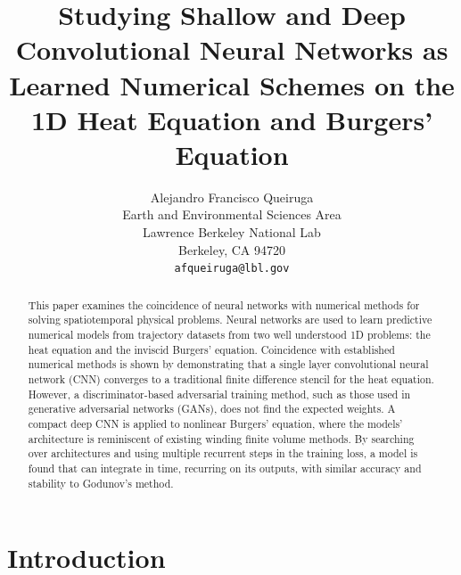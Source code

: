 \documentclass{article}
\title{Studying Shallow and Deep Convolutional Neural Networks as Learned Numerical
  Schemes on the 1D
  Heat Equation and Burgers' Equation}
\author{%
  Alejandro Francisco Queiruga\\%
  Earth and Environmental Sciences Area\\
  Lawrence Berkeley National Lab\\
  Berkeley, CA 94720\\
  \texttt{afqueiruga@lbl.gov}
}
\begin{document}
\maketitle

\begin{abstract}
  This paper examines the coincidence of neural networks with
  numerical methods for solving spatiotemporal physical
  problems. Neural networks are used to learn predictive numerical
  models from trajectory datasets from two well understood 1D
  problems: the heat equation and the inviscid
  Burgers' equation. Coincidence with established numerical methods is shown by demonstrating that a
  single layer convolutional neural network (CNN) converges to a traditional finite difference stencil for the
  heat equation. However, a discriminator-based adversarial training
  method, such as those used in generative adversarial networks (GANs), does not find the
  expected weights. A compact deep CNN is applied to nonlinear Burgers'
  equation, where the models' architecture is reminiscent of existing winding
  finite volume methods.
  By searching over architectures and using multiple
  recurrent steps in the training loss, a model is
  found that can integrate in time, recurring on its outputs, with
  similar accuracy and stability to Godunov's method.
\end{abstract}

\section{Introduction}
\end{document}

